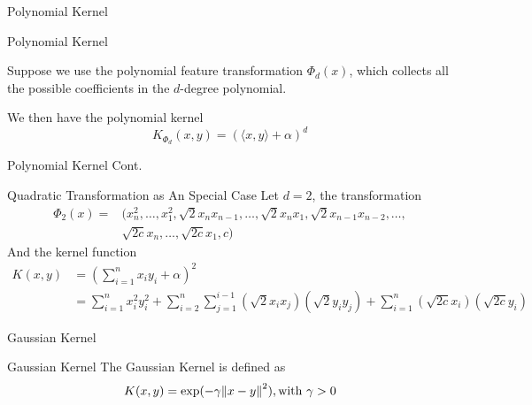 \documentclass[10pt, compress]{beamer}
\begin{document}
\begin{frame}[fragile]{Polynomial Kernel}

  \begin{block}{Polynomial Kernel}

    Suppose we use the polynomial feature transformation \( \Phi_{d}(x) \), which collects all the possible coefficients in the \(d\)-degree polynomial.

    We then have the polynomial kernel
    \[
      K_{\Phi_{d}}(x, y) = {(\langle x,y \rangle + \alpha)}^{d}
    \]
  \end{block}

\end{frame}

\begin{frame}[fragile]{Polynomial Kernel Cont.}

  \begin{block}{Quadratic Transformation as An Special Case}
    Let \( d=2 \), the transformation
    \begin{align*}
      \Phi_{2}(x) =& (x_{n}^{2}, \dots, x_{1}^{2}, \sqrt{2}x_{n}x_{n-1}, \dots, \sqrt{2}x_{n}x_{1}, \sqrt{2}x_{n-1}x_{n-2}, \dots, \\
                  &\sqrt{2c}x_{n}, \dots, \sqrt{2c}x_{1}, c)
    \end{align*}
    And the kernel function
    \begin{align*}
      K(x, y) &= (\sum_{i=1}^{n} x_{i}y_{i} + \alpha)^{2} \\
            &= \sum_{i=1}^{n}x_{i}^{2}y_{i}^{2} + \sum_{i=2}^{n}\sum_{j=1}^{i-1}(\sqrt{2}x_{i}x_{j})(\sqrt{2}y_{i}y_{j}) + \sum_{i=1}^{n}(\sqrt{2c}x_{i})(\sqrt{2c}y_{i})
    \end{align*}
  \end{block}
\end{frame}


\begin{frame}[fragile]{Gaussian Kernel}

  \begin{block}{Gaussian Kernel}
    The Gaussian Kernel is defined as
    \[
      K(x, y) = \exp(-\gamma{\| x-y \|}^{2}), \text{with \( \gamma > 0\)}
    \]
  \end{block}

\end{frame}
\end{document}
